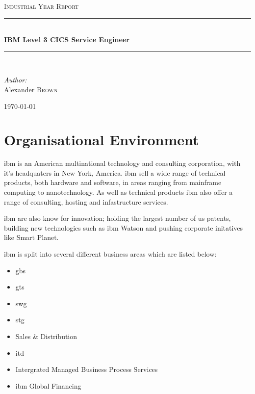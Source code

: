 \documentclass[a4paper,11pt]{report}
\newcommand{\HRule}{\rule{\linewidth}{0.5mm}}
\begin{document}
\begin{titlepage}

\begin{center}



\textsc{\Large Industrial Year Report}\\[0.5cm]


\HRule \\[0.4cm]
{ \huge \bfseries IBM Level 3 CICS Service Engineer}\\[0.4cm]

\HRule \\[1.5cm]

\begin{minipage}{0.4\textwidth}
\begin{flushleft} \large
\emph{Author:}\\
Alexander \textsc{Brown}
\end{flushleft}
\end{minipage}

\vfill

{\large \today}

\end{center}

\end{titlepage}

\tableofcontents

\chapter{Organisational Environment}

\Gls{ibm} is an American multinational technology and consulting corporation, with it's headquaters
in New York, America. \Gls{ibm} sell a wide range of technical products, both hardware and
software, in areas ranging from mainframe computing to nanotechnology. As well as technical 
products \gls{ibm} also offer a range of consulting, hosting and infastructure services.

\Gls{ibm} are also know for innovation; holding the largest number of \gls{us} patents, building
new technologies such as \gls{ibm} Watson and pushing corporate initatives like Smart Planet.

\Gls{ibm} is split into several different business areas which are listed below:

\begin{itemize}
\item \Gls{gbs}
\item \Gls{gts}
\item \Gls{swg}
\item \Gls{stg}
\item Sales \& Distribution
\item \Gls{itd}
\item Intergrated Managed Business Process Services
\item \Gls{ibm} Global Financing
\end{itemize}
\end{document}
